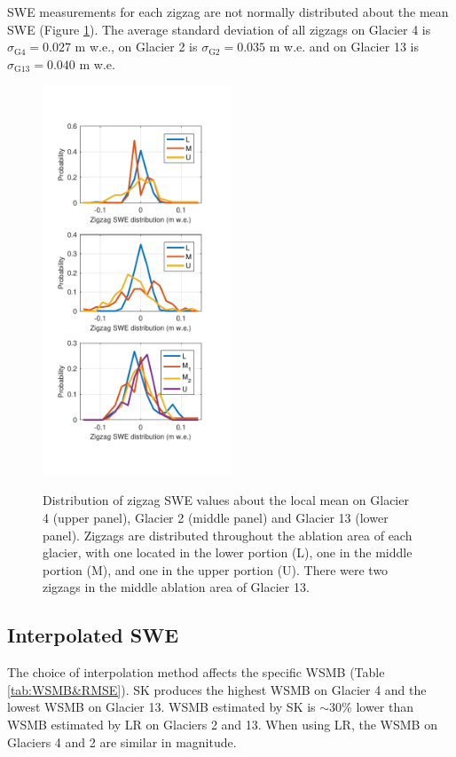 \documentclass[review,oneside, letterpaper]{igs}
\begin{document}
SWE measurements for each zigzag are not normally distributed about the mean SWE (Figure \ref{fig:ZigzagHistogram}). The average standard deviation of all zigzags on Glacier 4 is $\sigma_{\mathrm{G4}} =  0.027$ m w.e., on Glacier 2 is $\sigma_{\mathrm{G2}} =  0.035$ m w.e. and on Glacier 13 is $\sigma_{\mathrm{G13}} =  0.040$ m w.e.

\begin{figure}
	\centering
	\includegraphics[width =0.5\textwidth]{ZigzagHistogram.pdf}\\
	\caption{Distribution of zigzag SWE values about the local mean on Glacier 4 (upper panel), Glacier 2 (middle panel) and Glacier 13 (lower panel). Zigzags are distributed throughout the ablation area of each glacier, with one located in the lower portion (L), one in the middle portion (M), and one in the upper portion (U). There were two zigzags in the middle ablation area of Glacier 13.}
	\label{fig:ZigzagHistogram}
\end{figure}

\subsection{Interpolated SWE}

The choice of interpolation method affects the specific WSMB (Table \ref{tab:WSMB&RMSE}). SK produces the highest WSMB on Glacier 4 and the lowest WSMB on Glacier 13. WSMB estimated by SK is $\sim$30\% lower than WSMB estimated by LR on Glaciers 2 and 13. When using LR, the WSMB on Glaciers 4 and 2 are similar in magnitude.
\end{document}
